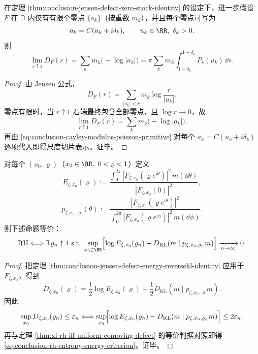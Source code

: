 \begin{corollary}\label{cor:conclusion-jensen-defect-poisson-slice-finite}
在定理 \ref{thm:conclusion-jensen-defect-zero-stock-identity} 的设定下，进一步假设 \(F\) 在 \(\mathbb D\) 内仅有有限个零点 \(\{a_k\}\)（按重数 \(m_k\)），并且每个零点可写为
\[
a_k=C(u_k+i\delta_k),\qquad u_k\in\RR,\ \delta_k>0.
\]
则
\[
\lim_{r\uparrow 1}D_F(r)
=\sum_k m_k\bigl(-\log|a_k|\bigr)
=\pi\sum_k m_k\int_{1-\delta_k}^{1+\delta_k}P_s(u_k)\,\dd s.
\]
\end{corollary}
\begin{proof}
由 Jensen 公式，
\[
D_F(r)=\sum_{|a_k|<r}m_k\log\frac{r}{|a_k|}.
\]
零点有限时，当 \(r\uparrow 1\) 右端最终包含全部零点，且 \(\log r\to 0\)，故
\[
\lim_{r\uparrow 1}D_F(r)=\sum_k m_k\bigl(-\log|a_k|\bigr).
\]
再由 \eqref{eq:conclusion-cayley-modulus-poisson-primitive} 对每个 \(a_k=C(u_k+i\delta_k)\) 逐项代入即得尺度切片表示。证毕。
\end{proof}

\begin{theorem}[RH 的熵--能量饱和一致判据]\label{thm:conclusion-rh-entropy-energy-saturation-criterion}
对每个 \((x_0,\varrho)\)（\(x_0\in\RR,\ 0<\varrho<1\)）定义
\[
E_{\zeta,x_0}(\varrho):=
\frac{\int_0^{2\pi}|F_{\zeta,x_0}(\varrho e^{\mathrm{i}\theta})|^2\,m(\dd\theta)}
{|F_{\zeta,x_0}(0)|^2},
\]
\[
p_{\zeta,x_0,\varrho}(\theta):=
\frac{|F_{\zeta,x_0}(\varrho e^{\mathrm{i}\theta})|^2}
{\int_0^{2\pi}|F_{\zeta,x_0}(\varrho e^{\mathrm{i}\phi})|^2\,m(\dd\phi)}.
\]
则下述命题等价：
\begin{equation}\label{eq:conclusion-rh-entropy-energy-criterion}
\mathrm{RH}
\Longleftrightarrow
\exists\,\varrho_n\uparrow 1\ \text{s.t.}\ 
\sup_{x_0\in\RR}
\Bigl[
\log E_{\zeta,x_0}(\varrho_n)
-D_{\mathrm{KL}}(m\mid p_{\zeta,x_0,\varrho_n}m)
\Bigr]\xrightarrow[n\to\infty]{}0.
\end{equation}
\end{theorem}
\begin{proof}
把定理 \ref{thm:conclusion-jensen-defect-energy-reversekl-identity} 应用于 \(F_{\zeta,x_0}\)，得到
\[
D_{\zeta,x_0}(\varrho)
=\frac12\log E_{\zeta,x_0}(\varrho)
-\frac12D_{\mathrm{KL}}(m\mid p_{\zeta,x_0,\varrho}m).
\]
因此
\[
\sup_{x_0}D_{\zeta,x_0}(\varrho_n)\le \varepsilon_n
\Longleftrightarrow
\sup_{x_0}\!\Bigl[\log E_{\zeta,x_0}(\varrho_n)-D_{\mathrm{KL}}(m\mid p_{\zeta,x_0,\varrho_n}m)\Bigr]\le 2\varepsilon_n.
\]
再与定理 \ref{thm:xi-rh-iff-uniform-comoving-defect} 的等价判据对照即得 \eqref{eq:conclusion-rh-entropy-energy-criterion}。证毕。
\end{proof}

